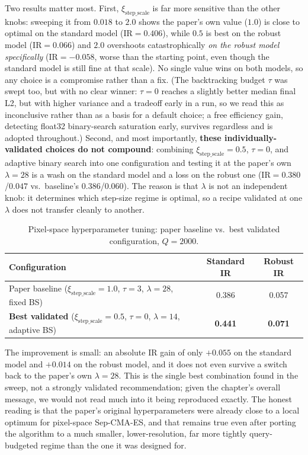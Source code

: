 \documentclass[11pt, a4paper]{article}
\begin{document}
Two results matter most. First, $\xi_{\text{step\_scale}}$ is far more sensitive than the other knobs: sweeping it from $0.018$ to $2.0$ shows the paper's own value ($1.0$) is close to optimal on the standard model ($\mathrm{IR}=0.406$), while $0.5$ is best on the robust model ($\mathrm{IR}=0.066$) and $2.0$ overshoots catastrophically \emph{on the robust model specifically} ($\mathrm{IR}=-0.058$, worse than the starting point, even though the standard model is still fine at that scale). No single value wins on both models, so any choice is a compromise rather than a fix. (The backtracking budget $\tau$ was swept too, but with no clear winner: $\tau=0$ reaches a slightly better median final L2, but with higher variance and a tradeoff early in a run, so we read this as inconclusive rather than as a basis for a default choice; a free efficiency gain, detecting float32 binary-search saturation early, survives regardless and is adopted throughout.) Second, and most importantly, \textbf{these individually-validated choices do not compound}: combining $\xi_{\text{step\_scale}}=0.5$, $\tau=0$, and adaptive binary search into one configuration and testing it at the paper's own $\lambda=28$ is a wash on the standard model and a loss on the robust one ($\mathrm{IR}=0.380$/$0.047$ vs.\ baseline's $0.386$/$0.060$). The reason is that $\lambda$ is not an independent knob: it determines which step-size regime is optimal, so a recipe validated at one $\lambda$ does not transfer cleanly to another.

\begin{table}[htbp]
\centering
\caption{Pixel-space hyperparameter tuning: paper baseline vs.\ best validated configuration, $Q=2000$.}
\label{tab:tuning_summary}
\begin{tabular}{lcc}
\toprule
Configuration & Standard IR & Robust IR \\
\midrule
Paper baseline ($\xi_{\text{step\_scale}}=1.0$, $\tau=3$, $\lambda=28$, fixed BS) & 0.386 & 0.057 \\
\textbf{Best validated} ($\xi_{\text{step\_scale}}=0.5$, $\tau=0$, $\lambda=14$, adaptive BS) & \textbf{0.441} & \textbf{0.071} \\
\bottomrule
\end{tabular}
\end{table}

The improvement is small: an absolute IR gain of only $+0.055$ on the standard model and $+0.014$ on the robust model, and it does not even survive a switch back to the paper's own $\lambda=28$. This is the single best combination found in the sweep, not a strongly validated recommendation; given the chapter's overall message, we would not read much into it being reproduced exactly. The honest reading is that the paper's original hyperparameters were already close to a local optimum for pixel-space Sep-CMA-ES, and that remains true even after porting the algorithm to a much smaller, lower-resolution, far more tightly query-budgeted regime than the one it was designed for.
\end{document}
